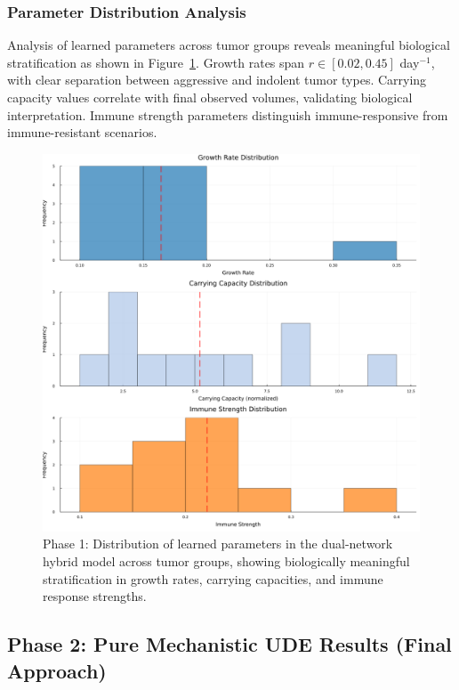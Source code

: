 \documentclass{juliacon}
\begin{document}
\subsubsection{Parameter Distribution Analysis}

Analysis of learned parameters across tumor groups reveals meaningful biological stratification as shown in Figure~\ref{fig:hybrid_params}. Growth rates span $r \in [0.02, 0.45]$ day$^{-1}$, with clear separation between aggressive and indolent tumor types. Carrying capacity values correlate with final observed volumes, validating biological interpretation. Immune strength parameters distinguish immune-responsive from immune-resistant scenarios.

\begin{figure}[H]\centering
\includegraphics[width=\linewidth]{hybrid_param_distributions.png}
\caption{Phase 1: Distribution of learned parameters in the dual-network hybrid model across tumor groups, showing biologically meaningful stratification in growth rates, carrying capacities, and immune response strengths.}
\label{fig:hybrid_params}
\end{figure}

\subsection{Phase 2: Pure Mechanistic UDE Results (Final Approach)}
\end{document}
